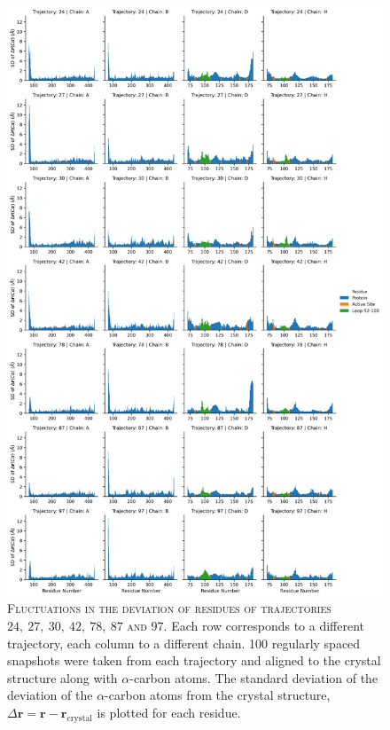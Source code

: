 \begin{figure}[ph!]
    \centering
    \includegraphics[height=0.8\textheight]{chapters/aadh/figures/sd_dev_by_residue.png}
    \caption[Fluctuations in the deviation of residues of select trajectories]{\textsc{Fluctuations in the deviation of residues of trajectories $24,\ 27,\ 30,\ 42,\ 78,\ 87$ and $97$}. Each row corresponds to a different trajectory, each column to a different chain. \num{100} regularly spaced snapshots were taken from each trajectory and aligned to the crystal structure along with $\alpha$-carbon atoms. The standard deviation of the deviation of the $\alpha$-carbon atoms from the crystal structure, $\Delta\mathbf{r} = \mathbf{r}-\mathbf{r}_{\mathrm{crystal}}$ is plotted for each residue.}
    \label{fig:aadh_sd_dev_by_res}
\end{figure}


